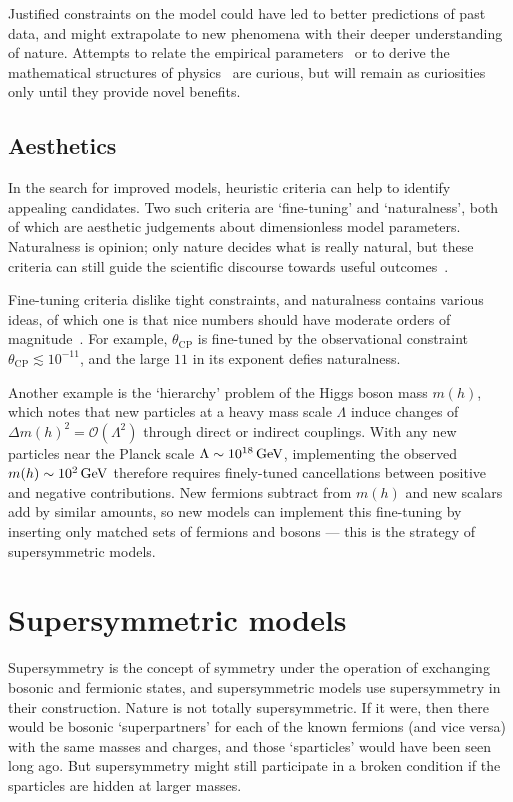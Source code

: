 Justified constraints on the model could have led to better predictions of
past data, and might extrapolate to new phenomena with their deeper
understanding of nature.
Attempts to relate the empirical parameters~\cite{
sato1979ratio,
beg1982gauge,
koide1983fermion,
denterria2012gaussian
}
or to derive the mathematical structures of physics~\cite{
goyal2010origin,
skilling2021abc,
axioms1010038
}
are curious, but will remain as curiosities only until they provide novel
benefits.


\subsection{Aesthetics}
In the search for improved models, heuristic criteria can help to identify
appealing candidates.
Two such criteria are `fine-tuning' and `naturalness', both of which are
aesthetic judgements about dimensionless model parameters.
Naturalness is opinion; only nature decides what is really natural,
but these criteria can still guide the scientific discourse towards useful
outcomes~\cite{wells2020discovery}.

Fine-tuning criteria dislike tight constraints, and naturalness contains
various ideas, of which one is that nice numbers should have moderate orders of
magnitude~\cite{giudice2008naturally}.
For example, $\theta_\mathrm{CP}$ is fine-tuned by the observational constraint
$\theta_\mathrm{CP} \lesssim 10^{-11}$, and the large $11$ in its exponent
defies naturalness.

Another example is the `hierarchy' problem of the Higgs boson mass $m(h)$,
which notes that new particles at a heavy mass scale $\Lambda$ induce changes
of $\Delta m(h)^2 = \mathcal{O}(\Lambda^2)$
through direct or indirect couplings.
With any new particles near the Planck scale $\Lambda \sim 10^{18}\,\eV[G]$,
implementing the observed $m(h) \sim 10^{2}\,\eV[G]$ therefore requires
finely-tuned cancellations between positive and negative contributions.
New fermions subtract from $m(h)$ and new scalars add by similar amounts,
so new models can implement this fine-tuning by inserting only matched sets of
fermions and bosons --- this is the strategy of supersymmetric models.


\section{Supersymmetric models}
\label{sec:theory_susy}
Supersymmetry is the concept of symmetry under the operation of exchanging
bosonic and fermionic states, and supersymmetric models use supersymmetry in
their construction.
Nature is not totally supersymmetric.
If it were, then there would be bosonic `superpartners' for each of the known
fermions (and vice versa) with the same masses and charges, and those
`sparticles' would have been seen long ago.
But supersymmetry might still participate in a broken condition if the
sparticles are hidden at larger masses.

